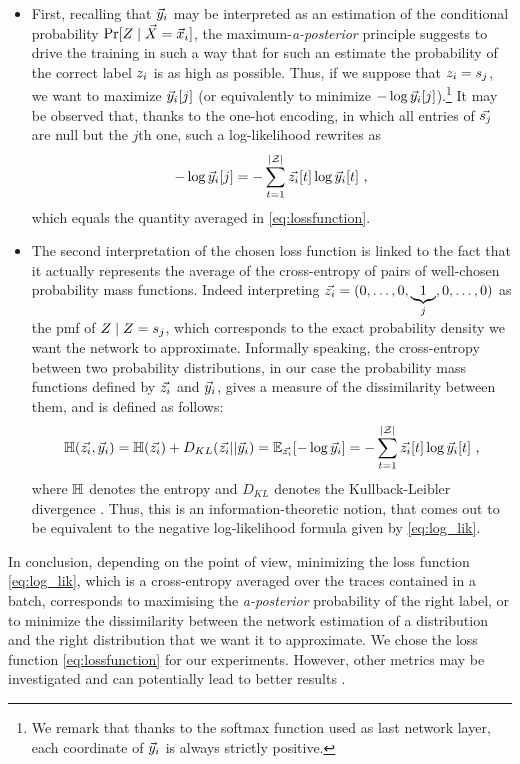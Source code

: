 \begin{itemize}
\item First, recalling that $\vec{y}_i$ may be interpreted as an estimation of the conditional probability $\prob[\given{\sensRandVar}{\vaLeakVec=\vLeakVec_i}]$, the maximum-\textit{a-posterior} principle suggests to drive the training in such a way that for such an estimate the probability of the correct label $z_i$ is as high as possible. Thus, if we suppose that $z_i = s_{j}$, we want to maximize $\vec{y}_i[j]$ (or equivalently to minimize $-\log{\ensuremath {\vec{y}}_i[j]}$).\footnote{We remark that thanks to the softmax function used as last network layer, each coordinate of $\vec{y}_i$ is always strictly positive.} It may be observed that, thanks to the one-hot encoding, in which all entries of $\vec{s_{j}}$ are null but the $j$th one, such a log-likelihood rewrites as 
\begin{equation}\label{eq:log_lik}
-\log{\ensuremath {\vec{y}}_i[j]} = -\sum_{t=1}^{|\mathcal{Z}|}\vec{z_i}[t]\log{\ensuremath {\vec{y}}_i[t]} \mbox{ ,}
\end{equation}
which equals the quantity averaged in \eqref{eq:lossfunction}.
\item The second interpretation of the chosen loss function is linked to the fact that it actually represents the average of  the cross-entropy of pairs of well-chosen probability mass functions. Indeed interpreting $\vec{z_i} = (0,\ldots , 0,\underbrace{1}_{j},0,\dots,0)$ as the pmf of $\given{\sensRandVar}{\sensRandVar = \sensVarValue{j}}$, which corresponds to the exact probability density we want the network to approximate. Informally speaking, the cross-entropy between two probability distributions, in our case the probability mass functions defined by $\vec{z_i}$ and $\vec{y}_i$, gives a measure of the dissimilarity between them, and is defined as follows:
\begin{equation}\label{eq:crossentropy}
\mathbb{H}(\vec{z_i}, \vec{y}_i) = \mathbb{H}(\vec{z_i}) + D_{KL}(\vec{z_i} || \vec{y}_i) = \mathbb{E}_{\vec{z_i}}[-\log{\ensuremath {\vec{y}}_i}] = -\sum_{t=1}^{|\mathcal{Z}|}\vec{z_i}[t]\log{\ensuremath {\vec{y}}_i[t]} \mbox{ ,}
\end{equation}
where $\mathbb{H}$ denotes the entropy and $D_{KL}$ denotes the Kullback-Leibler divergence \cite{christopher2006pattern}. Thus, this is an information-theoretic notion, that comes out to be equivalent to the negative log-likelihood formula given by \eqref{eq:log_lik}. 
\end{itemize}
In conclusion, depending on the point of view, minimizing the loss function \eqref{eq:log_lik}, which is a cross-entropy averaged over the traces contained in a batch, corresponds to maximising the \textit{a-posterior} probability of the right label, or to minimize the dissimilarity between the network estimation of a distribution and the right distribution that we want it to approximate. 
We chose the loss function \eqref{eq:lossfunction} for our experiments. However, other metrics may be investigated and can
potentially lead to better results \cite{MHK10,SSZU15}. \\

